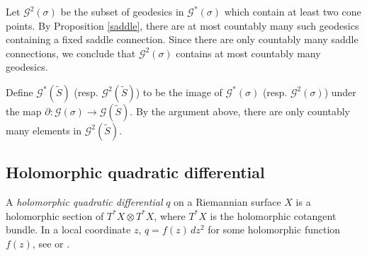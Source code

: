 \documentclass[reqno]{amsart}
\theoremstyle{plain}
\theoremstyle{definition}
\theoremstyle{remark}
\theoremstyle{definition}
\newcommand{\?}{\textcolor{red}{?}}
\newcommand{\Gsigma}{\mathcal{G}(\sigma) }
\newcommand{\Gssigma}{\mathcal{G}^*(\sigma) }
\newcommand{\Gtsigma}{\mathcal{G}^2(\sigma) }
\newcommand{\Gs}{\mathcal{G}(\tilde{S}) }
\newcommand{\Gss}{\mathcal{G}^*(\tilde{S}) }
\newcommand{\Gts}{\mathcal{G}^2(\tilde{S}) }
\begin{document}
Let $\Gtsigma$ be the subset of geodesics in $\Gssigma$ which contain at least two cone points. By Proposition \ref{saddle}, there are at most countably many such geodesics containing a fixed saddle connection. Since there are only countably many saddle connections, we conclude that $\Gtsigma$ contains at most countably many geodesics.

Define $\Gss$ (resp. $\Gts$) to be the image of $\Gssigma$ (resp. $\Gtsigma$) under the map $\partial:\Gsigma\to\Gs$. By the argument above, there are only countably many elements in $\Gts$.


\subsection{Holomorphic quadratic differential}\label{holonomy and cone angle}
A \textit{holomorphic quadratic differential} $q$ on a Riemannian surface $X$ is a holomorphic section of $T^*X\otimes T^*X$, where $T^*X$ is the holomorphic cotangent bundle. In a local coordinate $z$, $q=f(z)\,dz^2$ for some holomorphic function $f(z)$, see \cite[]{strebel1984quadratic} or \cite[§2.1]{duchin2010length}.
\end{document}
